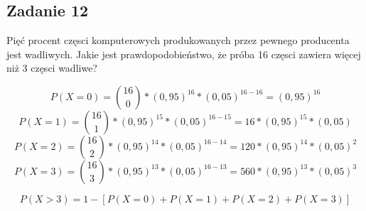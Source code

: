 \subsection{Zadanie 12}

Pięć procent częsci komputerowych produkowanych przez pewnego producenta jest wadliwych. Jakie jest prawdopodobieństwo, że próba 16 częsci zawiera więcej niż 3 częsci wadliwe?

$$
P(X = 0)={16\choose 0}*(0,95)^{16}*(0,05)^{16-16}=(0,95)^{16}
$$
$$
P(X = 1)={16\choose 1}*(0,95)^{15}*(0,05)^{16-15}=16*(0,95)^{15}*(0,05)
$$
$$
P(X = 2)={16\choose 2}*(0,95)^{14}*(0,05)^{16-14}=120*(0,95)^{14}*(0,05)^{2}
$$
$$
P(X = 3)={16\choose 3}*(0,95)^{13}*(0,05)^{16-13}=560*(0,95)^{13}*(0,05)^{3}
$$

$$
P(X > 3)=1-[P(X = 0) + P(X = 1) + P(X = 2) + P(X = 3)]
$$
